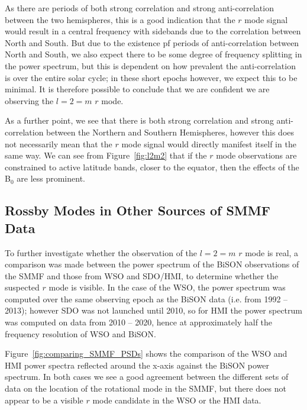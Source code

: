 As there are periods of both strong correlation and strong anti-correlation between the two hemispheres, this is a good indication that the $r$ mode signal would result in a central frequency with sidebands due to the correlation between North and South. But due to the existence pf periods of anti-correlation between North and South, we also expect there to be some degree of frequency splitting in the power spectrum, but this is dependent on how prevalent the anti-correlation is over the entire solar cycle; in these short epochs however, we expect this to be minimal. It is therefore possible to conclude that we are confident we are observing the $l=2=m$ $r$ mode.

As a further point, we see that there is both strong correlation and strong anti-correlation between the Northern and Southern Hemispheres, however this does not necessarily mean that the $r$ mode signal would directly manifest itself in the same way. We can see from Figure~\ref{fig:l2m2} that if the $r$ mode observations are constrained to active latitude bands, closer to the equator, then the effects of the B$_0$ are less prominent.

\subsection{Rossby Modes in Other Sources of SMMF Data}

To further investigate whether the observation of the  $l=2=m$ $r$ mode is real, a comparison was made between the power spectrum of the BiSON observations of the SMMF and those from WSO and SDO/HMI, to determine whether the suspected $r$ mode is visible. In the case of the WSO, the power spectrum was computed over the same observing epoch as the BiSON data (i.e. from 1992 -- 2013); however SDO was not launched until 2010, so for HMI the power spectrum was computed on data from 2010 -- 2020, hence at approximately half the frequency resolution of WSO and BiSON.

Figure~\ref{fig:comparing_SMMF_PSDs} shows the comparison of the WSO and HMI power spectra reflected around the x-axis against the BiSON power spectrum. In both cases we see a good agreement between the different sets of data on the location of the rotational mode in the SMMF, but there does not appear to be a visible $r$ mode candidate in the WSO or the HMI data.

